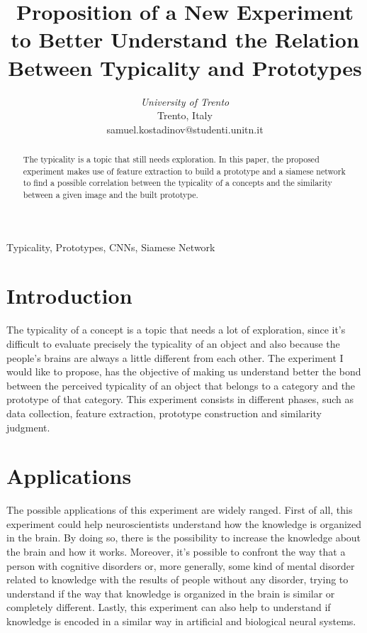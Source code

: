 \documentclass[conference]{IEEEtran}
\begin{document}
	\title{Proposition of a New Experiment to Better Understand the Relation Between Typicality and Prototypes}


	\author{
	\textit{University of Trento}\\
	Trento, Italy \\
	samuel.kostadinov@studenti.unitn.it}


	\maketitle


	\begin{abstract}
		
		The typicality is a topic that still needs exploration. In this paper, the proposed experiment makes use of feature extraction to build a prototype and a siamese network to find a possible correlation 
		between the typicality of a concepts and the similarity between a given image and the built prototype. 
		
	\end{abstract}

	\begin{IEEEkeywords}
		Typicality, Prototypes, CNNs, Siamese Network
	\end{IEEEkeywords}


	\section{Introduction}
		
		\noindent The typicality of a concept is a topic that needs a lot of exploration, since it's difficult to evaluate precisely the typicality of an object 
		and also because the people's brains are always a little different from each other. The experiment I would like to propose, has the objective of 
		making us understand better the bond between the perceived typicality of an object that belongs to a category and the prototype of that category.
		This experiment consists in different phases, such as data collection, feature extraction, prototype construction and similarity judgment.
		
	\section{Applications}
	
		\noindent The possible applications of this experiment are widely ranged. First of all, this experiment could help neuroscientists understand how the knowledge is 
		organized in the brain. By doing so, there is the possibility to increase the knowledge about the brain and how it works. Moreover, it's possible to confront 
		the way that a person with cognitive disorders or, more generally, some kind of mental disorder related to knowledge with the results of people without 
		any disorder, trying to understand if the way that knowledge is organized in the brain is similar or completely different. Lastly, this experiment can 
		also help to understand if knowledge is encoded in a similar way in artificial and biological neural systems. 
\end{document}
